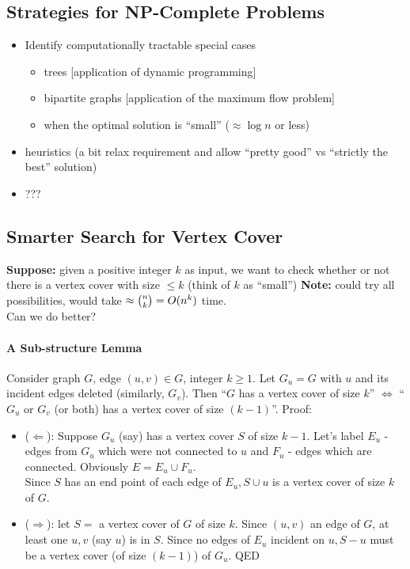 \documentclass{scrartcl}
\begin{document}
\subsection{Strategies for NP-Complete Problems}
\label{sec:17-1-1}
\begin{itemize}
\item Identify computationally tractable special cases
  \begin{itemize}
  \item trees [application of dynamic programming]
  \item bipartite graphs [application of the maximum flow problem]
  \item when the optimal solution is ``small'' ($\approx \log n$ or less)
  \end{itemize}
\item heuristics (a bit relax requirement and allow ``pretty good'' vs
  ``strictly the best'' solution)
\item ??? 
\end{itemize}
\subsection{Smarter Search for Vertex Cover}
\label{sec:17-2}
{\bf Suppose: } given a positive integer $k$ as input, we want to check whether
or not there is a vertex cover with size $\leq k$ (think of $k$ as ``small'')
{\bf Note: } could try all possibilities, would take $\approx \tbinom{n}k =
O(n^k)$ time.\\
Can we do better?
\paragraph{A Sub-structure Lemma}
Consider graph $G$, edge $(u, v) \in G$, integer $k \geq 1$. Let $G_u = G$ with
$u$ and its incident edges deleted (similarly, $G_v$). Then ``$G$ has a vertex
cover of size $k$'' $\Leftrightarrow$ ``$G_u$ or $G_v$ (or both) has a vertex
cover of size $(k-1)$''. Proof:
\begin{itemize}
\item ($\Leftarrow$): Suppose $G_u$ (say) has a vertex cover $S$ of size $k-1$.
 Let's label $E_u$ - edges from $G_u$ which were not connected to $u$ and $F_u$
  - edges which are connected. Obviously $E = E_u \cup F_u$.\\
Since $S$ has an end point of each edge of $E_u, S \cup u$ is a vertex cover of
size $k$ of $G$.
\item ($\Rightarrow$): let $S=$ a vertex cover of $G$ of size $k$. Since $(u,
  v)$ an edge of $G$, at least one $u, v$ (say $u$) is in $S$. Since no edges of
  $E_u$ incident on $u, S - u$ must be a vertex cover (of size $(k-1)$) of
  $G_u$. 
QED
\end{itemize}
\end{document}
